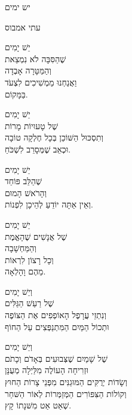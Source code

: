 \documentclass{article}
\begin{document}
    \begin{hebrew}

        \begin{center}
          {\huge יש ימים}

          {\Large עתי אמבוס}
        \end{center}

        \maketitle

        יֵשׁ יָמִים \\
        שֶׁהַסִּבָּה לֹא נִמְצֵאת \\
        וְהַמַּטָּרָה אָבְדָה \\
        וַאֲנַחְנוּ מַמְשִׁיכִים לִצְעֹד \\
        בַּמָּקוֹם.

        יֵשׁ יָמִים \\
        שֶׁל טָעוּיוֹת מָרוֹת \\
        וְתִסְכּוּל הַשּׁוֹכֵן בְּכָל חֶלְקָה טוֹבָה \\
        וּכְאֵב שֶׁמְּסָרֵב לִשְׁכֹּחַ.

        יֵשׁ יָמִים \\
        שֶׁהַלֵּב פּוֹחֵד \\
        וְהָרֹאשׁ הָמוּם \\
        וְאֵין אַתָּה יוֹדֵעַ לְהֵיכָן לִפְנוֹת.

        יֵשׁ יָמִים \\
        שֶׁל אֲנָשִׁים שֶׁהָאֱמֶת \\
        וְהַמַּחְשָׁבָה \\
        וְכָל רָצוֹן לִרְאוֹת \\
        מֵהֶם וָהָלְאָה.


        וְיֵשׁ יָמִים \\
        שֶׁל רַעַשׁ הַגַּלִּים \\
        וְנִתְזֵי עֲרָפֶל הָאוֹפְפִים אֶת הַצּוֹפֶה \\
        וּתְכוֹל הַמַּיִם הַמִּתְנַפְּצִים עַל הַחוֹף

        וְיֵשׁ יָמִים \\
        שֶׁל שָׁמַיִם שֶׁצְּבוּעִים בְּאָדֹם וְכָתֹם \\
        וּזְרִיחָה הָעוֹלֶה מִלַּיְלָה מְעֻנָּן \\
        וְשָׂדוֹת יְרֻקִּים הַמּוּגַנִּים מִפְּנֵי צָרוֹת הַחוּץ \\
        וְקוֹלוֹת הַצִּפּוֹרִים הַמְּזַמְּרוֹת לְאוֹר הַשּׁחַר \\
        שְׁאַט אַט מִשּׁנָתוֹ קָץ.


\end{hebrew}
\end{document}
